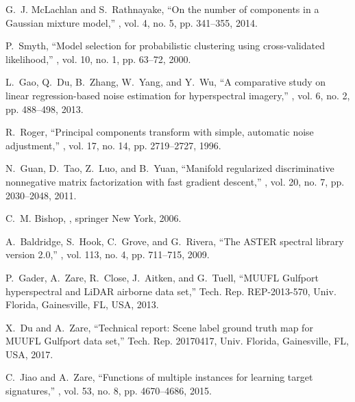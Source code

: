 \documentclass[twocolumn,english]{IEEEtran}
\theoremstyle{plain}
\begin{document}
\begin{thebibliography}{10}
G.~J. McLachlan and S.~Rathnayake,
\newblock ``On the number of components in a {Gaussian} mixture model,''
, vol. 4, no. 5, pp. 341--355, 2014.

P.~Smyth,
\newblock ``Model selection for probabilistic clustering using cross-validated
  likelihood,''
, vol. 10, no. 1, pp. 63--72, 2000.

L.~Gao, Q.~Du, B.~Zhang, W.~Yang, and Y.~Wu,
\newblock ``A comparative study on linear regression-based noise estimation for
  hyperspectral imagery,''
, vol. 6, no. 2, pp. 488--498, 2013.

R.~Roger,
\newblock ``Principal components transform with simple, automatic noise
  adjustment,''
, vol. 17, no. 14, pp.
  2719--2727, 1996.

N.~Guan, D.~Tao, Z.~Luo, and B.~Yuan,
\newblock ``Manifold regularized discriminative nonnegative matrix
  factorization with fast gradient descent,''
, vol. 20, no. 7, pp.
  2030--2048, 2011.

C.~M. Bishop,
,
\newblock springer New York, 2006.

A.~Baldridge, S.~Hook, C.~Grove, and G.~Rivera,
\newblock ``The {ASTER} spectral library version 2.0,''
, vol. 113, no. 4, pp. 711--715,
  2009.

P.~Gader, A.~Zare, R.~Close, J.~Aitken, and G.~Tuell,
\newblock ``{MUUFL} {G}ulfport hyperspectral and {LiDAR} airborne data set,''
\newblock Tech. {R}ep. REP-2013-570, Univ. Florida, Gainesville, FL, USA, 2013.

X.~Du and A.~Zare,
\newblock ``Technical report: Scene label ground truth map for {MUUFL Gulfport}
  data set,''
\newblock Tech. {R}ep. 20170417, Univ. Florida, Gainesville, FL, USA, 2017.

C.~Jiao and A.~Zare,
\newblock ``Functions of multiple instances for learning target signatures,''
, vol. 53,
  no. 8, pp. 4670--4686, 2015.


\end{thebibliography}
\end{document}
